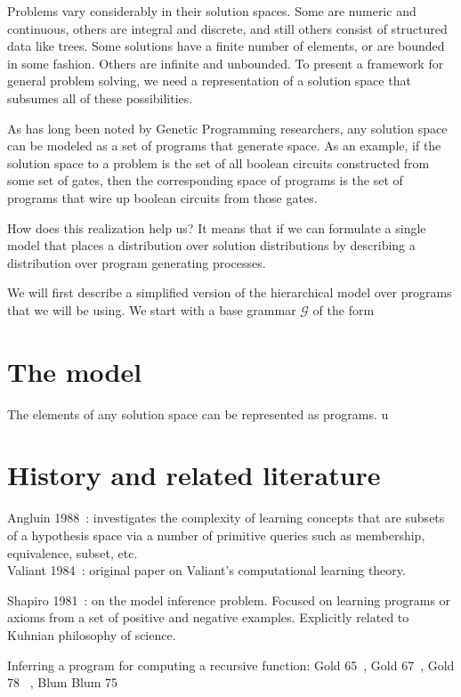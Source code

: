 \documentclass{article}
\begin{document}
Problems vary considerably in their solution spaces. Some are numeric and
continuous, others are integral and discrete, and still others consist of
structured data like trees. Some solutions have a finite number of elements, or
are bounded in some fashion. Others are infinite and unbounded. To present a
framework for general problem solving, we need a representation of a solution
space that subsumes all of these possibilities. 

As has long been noted by
Genetic Programming researchers, any solution space can be modeled as a set of
programs that generate space. As an example, if the solution space to a problem
is the set of all boolean circuits constructed from some set of gates, then the
corresponding space of programs is the set of programs that wire up boolean
circuits from those gates. 

How does this realization help us? It means that if we can formulate a single
model that places a distribution over solution distributions by describing a
distribution over program generating processes.

We will first describe a simplified version of the hierarchical model over programs that we will be using. We start with a base grammar $\mathcal{G}$ of the form 
\section{The model}
The elements of any solution space can be represented as programs. u
 \section{History and related literature}
Angluin 1988~\cite{angluin1988queries}: investigates the complexity of
learning concepts that are subsets of a hypothesis space via a number
of primitive queries such as membership, equivalence, subset, etc. \\

Valiant 1984~\cite{valiant1984theory}: original paper on Valiant's
computational learning theory.

Shapiro 1981~\cite{shapiro1981algorithm}: on the model inference
problem. Focused on learning programs or axioms from a set of positive
and negative examples. Explicitly related to Kuhnian philosophy of
science.

Inferring a program for computing a recursive function: 
Gold 65~\cite{gold1965limiting}, 
Gold 67~\cite{gold1967language},
Gold 78 ~\cite{gold1978complexity},
Blum  Blum 75~\cite{blum1975toward}
\end{document}
